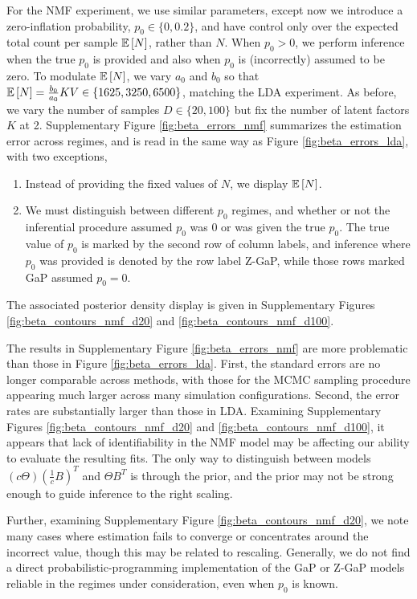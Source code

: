 For the NMF experiment, we use similar parameters, except now we introduce a
zero-inflation probability, $p_{0} \in \{0, 0.2\}$, and have control only over
the expected total count per sample $\mathbb{E}\left[{N}\right]$, rather than $N$. When $p_{0} >
0$, we perform inference when the true $p_0$ is provided and also when $p_{0}$
is (incorrectly) assumed to be zero. To modulate $\mathbb{E}\left[{N}\right]$, we vary $a_{0}$ and
$b_{0}$ so that $\mathbb{E}\left[{N}\right] = \frac{b_{0}}{a_{0}}KV \in \{1625, 3250, 6500\}$,
matching the LDA experiment. As before, we vary the number of samples $D \in
\{20, 100\}$ but fix the number of latent factors $K$ at 2. Supplementary Figure
\ref{fig:beta_errors_nmf} summarizes the estimation error across regimes, and is
read in the same way as Figure \ref{fig:beta_errors_lda}, with two exceptions,
\begin{enumerate}
\item Instead of providing the fixed values of $N$, we display $\mathbb{E}\left[{N}\right]$.
\item We must distinguish between different $p_{0}$ regimes, and whether or not
  the inferential procedure assumed $p_{0}$ was 0 or was given the true $p_{0}$.
  The true value of $p_0$ is marked by the second row of column labels, and
  inference where $p_{0}$ was provided is denoted by the row label Z-GaP, while
  those rows marked GaP assumed $p_{0} = 0$.
\end{enumerate}
The associated posterior density display is given in Supplementary Figures
\ref{fig:beta_contours_nmf_d20} and \ref{fig:beta_contours_nmf_d100}.

The results in Supplementary Figure \ref{fig:beta_errors_nmf} are more
problematic than those in Figure \ref{fig:beta_errors_lda}. First, the standard
errors are no longer comparable across methods, with those for the MCMC sampling
procedure appearing much larger across many simulation configurations. Second,
the error rates are substantially larger than those in LDA. Examining
Supplementary Figures \ref{fig:beta_contours_nmf_d20} and
\ref{fig:beta_contours_nmf_d100}, it appears that lack of identifiability in the
NMF model may be affecting our ability to evaluate the resulting fits. The only
way to distinguish between models $\left(c\Theta\right)\left(\frac{1}{c}
B\right)^{T}$ and $\Theta B^{T}$ is through the prior, and the prior may not be
strong enough to guide inference to the right scaling.

Further, examining Supplementary Figure \ref{fig:beta_contours_nmf_d20}, we note
many cases where estimation fails to converge or concentrates around the
incorrect value, though this may be related to rescaling. Generally, we do not
find a direct probabilistic-programming implementation of the GaP or Z-GaP
models reliable in the regimes under consideration, even when $p_{0}$ is known.

